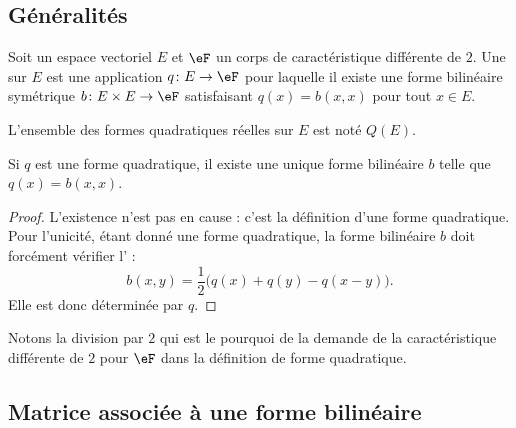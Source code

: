 \subsection{Généralités}

\begin{definition}   \label{DefBSIoouvuKR}
    Soit un espace vectoriel \( E\) et \( \eF\) un corps de caractéristique différente de \( 2\). Une  sur \( E\) est une application \( q\colon E\to \eF\) pour laquelle il existe une forme bilinéaire symétrique \( b\colon E\times E\to \eF\) satisfaisant \( q(x)=b(x,x)\) pour tout \( x\in E\).

    L'ensemble des formes quadratiques réelles sur \( E\) est noté \( Q(E)\).
\end{definition}

\begin{lemma}       \label{LEMooLKNTooSfLSHt}
    Si \( q\) est une forme quadratique, il existe une unique forme bilinéaire \( b\) telle que \( q(x)=b(x,x)\).
\end{lemma}

\begin{proof}
    L'existence n'est pas en cause : c'est la définition d'une forme quadratique. Pour l'unicité, étant donné une forme quadratique, la forme bilinéaire \( b\) doit forcément vérifier l' :
\begin{equation}    \label{EqMrbsop}
    b(x,y)=\frac{ 1 }{2}\big( q(x)+q(y)-q(x-y) \big).
\end{equation}
Elle est donc déterminée par \( q\).
\end{proof}
Notons la division par \( 2\) qui est le pourquoi de la demande de la caractéristique différente de \( 2\) pour \( \eF\) dans la définition de forme quadratique.

\subsection{Matrice associée à une forme bilinéaire}

